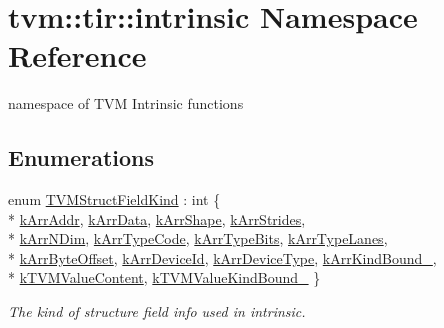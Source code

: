 \hypertarget{namespacetvm_1_1tir_1_1intrinsic}{}\section{tvm\+:\+:tir\+:\+:intrinsic Namespace Reference}
\label{namespacetvm_1_1tir_1_1intrinsic}


namespace of T\+VM Intrinsic functions  


\subsection*{Enumerations}
\begin{DoxyCompactItemize}
\item 
enum \hyperlink{namespacetvm_1_1tir_1_1intrinsic_a7aee573af86b33b88d123fc26a40cdd9}{T\+V\+M\+Struct\+Field\+Kind} \+: int \{ \\*
\hyperlink{namespacetvm_1_1tir_1_1intrinsic_a7aee573af86b33b88d123fc26a40cdd9a4db7d8a5cd05d94fe63484b1a6a5f41e}{k\+Arr\+Addr}, 
\hyperlink{namespacetvm_1_1tir_1_1intrinsic_a7aee573af86b33b88d123fc26a40cdd9ac4fd2e6f182e390a5f12bc0b86a7bdde}{k\+Arr\+Data}, 
\hyperlink{namespacetvm_1_1tir_1_1intrinsic_a7aee573af86b33b88d123fc26a40cdd9abd1c578a1b9382f7641e57d47cc0fef5}{k\+Arr\+Shape}, 
\hyperlink{namespacetvm_1_1tir_1_1intrinsic_a7aee573af86b33b88d123fc26a40cdd9a316dc2fac47b891f4a7cd4f6f1e2ea9c}{k\+Arr\+Strides}, 
\\*
\hyperlink{namespacetvm_1_1tir_1_1intrinsic_a7aee573af86b33b88d123fc26a40cdd9a6848c5265a37e6d8ff900962cffd24f9}{k\+Arr\+N\+Dim}, 
\hyperlink{namespacetvm_1_1tir_1_1intrinsic_a7aee573af86b33b88d123fc26a40cdd9a754ca8d37cdfbcbc5969782b86ca9e62}{k\+Arr\+Type\+Code}, 
\hyperlink{namespacetvm_1_1tir_1_1intrinsic_a7aee573af86b33b88d123fc26a40cdd9a794b84c54e74f7eb76c55c8b757cb07a}{k\+Arr\+Type\+Bits}, 
\hyperlink{namespacetvm_1_1tir_1_1intrinsic_a7aee573af86b33b88d123fc26a40cdd9a5d44e05899072b51faf77feef33a17e4}{k\+Arr\+Type\+Lanes}, 
\\*
\hyperlink{namespacetvm_1_1tir_1_1intrinsic_a7aee573af86b33b88d123fc26a40cdd9aace077df8be29cbf09dffeccb9c87361}{k\+Arr\+Byte\+Offset}, 
\hyperlink{namespacetvm_1_1tir_1_1intrinsic_a7aee573af86b33b88d123fc26a40cdd9a7010568a29d2c4672120433c51af8867}{k\+Arr\+Device\+Id}, 
\hyperlink{namespacetvm_1_1tir_1_1intrinsic_a7aee573af86b33b88d123fc26a40cdd9a34a8c297dd601e3a693d8b4ad1268a12}{k\+Arr\+Device\+Type}, 
\hyperlink{namespacetvm_1_1tir_1_1intrinsic_a7aee573af86b33b88d123fc26a40cdd9ad68bd1fb79d2f15de845fa682fea01c0}{k\+Arr\+Kind\+Bound\+\_\+}, 
\\*
\hyperlink{namespacetvm_1_1tir_1_1intrinsic_a7aee573af86b33b88d123fc26a40cdd9ac6ce092b04c704569325ff038a18eaf7}{k\+T\+V\+M\+Value\+Content}, 
\hyperlink{namespacetvm_1_1tir_1_1intrinsic_a7aee573af86b33b88d123fc26a40cdd9ac87458c0fb42f635a949331c07da6b58}{k\+T\+V\+M\+Value\+Kind\+Bound\+\_\+}
 \}\begin{DoxyCompactList}\small\item\em The kind of structure field info used in intrinsic. \end{DoxyCompactList}
\end{DoxyCompactItemize}
